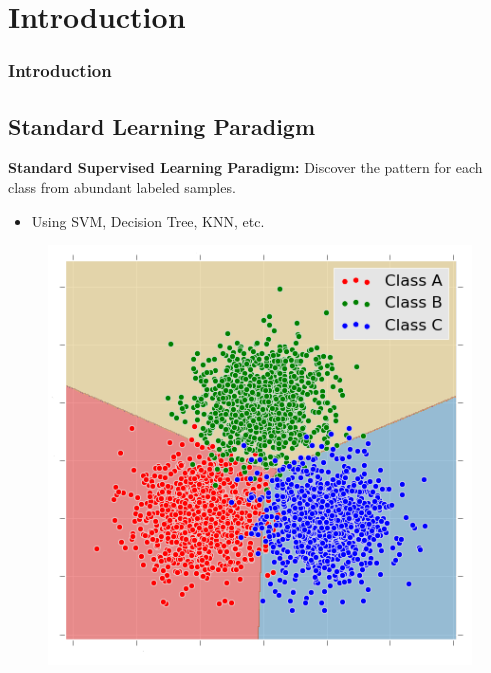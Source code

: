 \documentclass{beamer}
\begin{document}
\section{Introduction}
\begin{frame}
  \frametitle{Introduction}
    \subsection{Standard Learning Paradigm}
    \textbf{Standard Supervised Learning Paradigm:}
    Discover the pattern for each class from abundant labeled samples.
    \begin{itemize}
      \item Using SVM, Decision Tree, KNN, etc.
    \end{itemize}
    \begin{figure}
    \includegraphics[width= 0.5\linewidth]{multi.png}
    \end{figure}
\end{frame}
\end{document}
